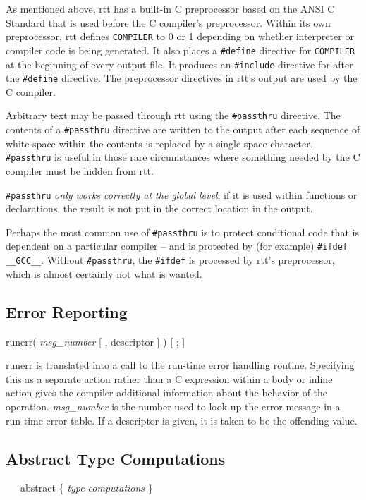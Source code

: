 As mentioned above, rtt has a built-in C preprocessor based on the ANSI C
Standard that is used before the C compiler's preprocessor. Within its own
preprocessor, rtt defines \texttt{COMPILER} to 0 or 1 depending on whether
interpreter or compiler code is being generated. It also places a
\texttt{\#define} directive for \texttt{COMPILER} at the beginning of every
output file. It produces an \texttt{\#include} directive for  after
the \texttt{\#define} directive. The preprocessor directives in rtt's output are
used by the C compiler.

Arbitrary text may be passed through rtt using the \texttt{\#passthru}
directive. The contents of a \texttt{\#passthru} directive are written to the
output after each sequence of white space within the contents is replaced by a
single space character. \texttt{\#passthru} is useful in those rare circumstances
where something needed by the C compiler must be hidden from rtt.

\texttt{\#passthru} {\em only works correctly at the global level\/}; if it is
used within functions or declarations, the result is not put in the correct
location in the output.

Perhaps the most common use of \texttt{\#passthru} is to protect conditional
code that is dependent on a particular compiler -- and is protected by (for
example) \texttt{\#ifdef \_\_GCC\_\_}. Without \texttt{\#passthru}, the
\texttt{\#ifdef} is processed by rtt's preprocessor, which is almost certainly
not what is wanted.

\subsection{Error Reporting}
{\ttfamily\mdseries
runerr( \textit{msg\_number} [ , descriptor ] ) [ ; ]}


runerr is translated into a call to the run-time error handling
routine. Specifying this as a separate action rather than a C
expression within a body or inline action gives the compiler
additional information about the behavior of the
operation. \textit{msg\_number} is the number used to look up the
error message in a run-time error table. If a descriptor is given, it
is taken to be the offending value.

\subsection{Abstract Type Computations}
{\ttfamily\mdseries
\ \ \ abstract \{ \textit{type-computations} \}}


